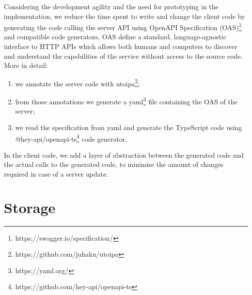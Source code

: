Considering the development agility and the need for prototyping in the implementation, we reduce the time spent to write and change the client code by generating the code calling the server API using OpenAPI Specification (OAS)\footnote{https://swagger.io/specification/} and compatible code generators.
OAS define a standard, language-agnostic interface to HTTP APIs which allows both humans and computers to discover and understand the capabilities of the service without access to the source code.
More in detail:
\begin{enumerate}
    \item we annotate the server code with utoipa\footnote{https://github.com/juhaku/utoipa};
    \item from those annotations we generate a yaml\footnote{https://yaml.org/} file containing the OAS of the server;
    \item we read the specification from yaml and generate the TypeScript code using @hey-api/openapi-ts\footnote{https://github.com/hey-api/openapi-ts} code generator.
\end{enumerate}
In the client code, we add a layer of abstraction between the generated code and the actual calls to the generated code, to minimise the amount of changes required in case of a server update.

\section{Storage}

